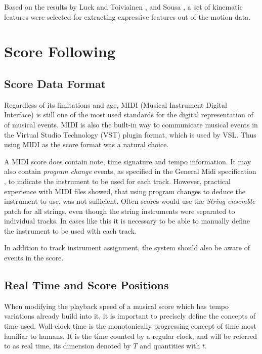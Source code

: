 Based on the results by Luck and Toiviainen \cite{luck2010},
and Sousa \cite{sousa1988},
a set of kinematic features were selected for extracting
expressive features out of the motion data.

\chapter{Score Following}
\label{chapter:score_following}


\section{Score Data Format}

Regardless of its limitations and age,
MIDI (Musical Instrument Digital Interface)
is still one of the most used standards
for the digital representation of of musical events.
MIDI is also the built-in way to communicate musical events
in the Virtual Studio Technology (VST) plugin format,
which is used by VSL.
Thus using MIDI as the score format was a natural choice.

A MIDI score does contain
note, time signature and tempo information.
It may also contain \textit{program change} events,
as specified in the General Midi specification \cite{},
to indicate the instrument to be used for each track.
However, practical experience with MIDI files showed,
that using program changes to deduce the instrument to use,
was not sufficient.
Often scores would use the
\textit{String ensemble} patch for all strings,
even though the string instruments were separated to individual tracks.
In cases like this it is necessary to be able to manually
define the instrument to be used with each track.

In addition to track instrument assignment,
the system should also be aware of events in the score.

\section{Real Time and Score Positions}
\label{sec:meth:read_and_score_time}

When modifying the playback speed of a musical score
which has tempo variations already build into it,
it is important to precisely define the concepts of time used.
Wall-clock time is the monotonically progressing concept of time
most familiar to humans.
It is the time counted by a regular clock,
and will be referred to as real time,
its dimension denoted by $T$ and quantities with $t$.

